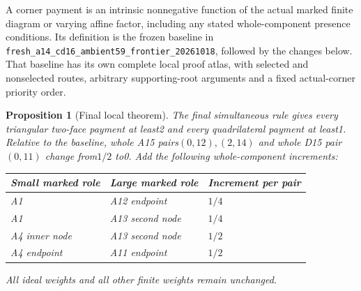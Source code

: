 \documentclass[11pt]{article}
\newtheorem{proposition}[theorem]{Proposition}
\theoremstyle{remark}\newtheorem{remark}[theorem]{Remark}
\newcommand{\cert}[1]{\nolinkurl{#1}}
\begin{document}
A corner payment is an intrinsic nonnegative function of the actual
marked finite diagram or varying affine factor, including any stated
whole-component presence conditions. Its definition is the frozen
baseline in \cert{fresh_a14_cd16_ambient59_frontier_20261018}, followed
by the changes below. That baseline has its own complete local proof
atlas, with selected and nonselected routes, arbitrary supporting-root
arguments and a fixed actual-corner priority order.

\begin{proposition}[Final local theorem]\label{prop:local}
The final simultaneous rule gives every triangular two-face payment
at least2 and every quadrilateral payment at least1. Relative to the
baseline, whole A15 pairs$(0,12),(2,14)$ and whole D15 pair$(0,11)$
change from$1/2$ to0. Add the following whole-component increments:
\begin{center}
\begin{tabular}{lll}
\toprule
Small marked role&Large marked role&Increment per pair\\\midrule
A1&A12 endpoint&$1/4$\\
A1&A13 second node&$1/4$\\
A4 inner node&A13 second node&$1/2$\\
A4 endpoint&A11 endpoint&$1/2$\\\bottomrule
\end{tabular}
\end{center}
All ideal weights and all other finite weights remain unchanged.
\end{proposition}
\end{document}
